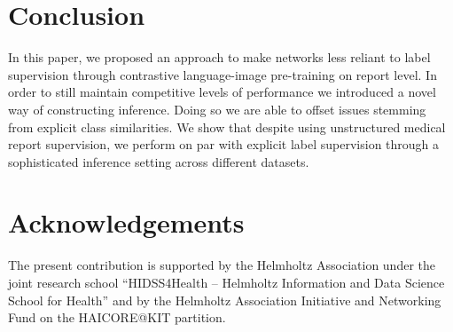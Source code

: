 \documentclass[runningheads]{llncs}
\begin{document}
 \section{Conclusion}
In this paper, we proposed an approach to make networks less reliant to label supervision through contrastive language-image pre-training on report level. In order to still maintain competitive levels of performance we introduced a novel way of constructing inference. Doing so we are able to offset issues stemming from explicit class similarities. 
We show that despite using unstructured medical report supervision, we perform on par with explicit label supervision through a sophisticated inference setting across different datasets. 
 \section{Acknowledgements}
The present contribution is supported by the Helmholtz Association under the joint research school “HIDSS4Health – Helmholtz Information and Data Science School for Health” and by the Helmholtz Association Initiative and
Networking Fund on the HAICORE@KIT partition. 

\end{document}
